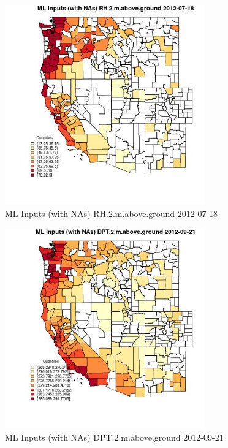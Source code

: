\begin{figure} 
\centering  
\includegraphics[width=0.77\textwidth]{Code_Outputs/Report_ML_input_PM25_Step4_part_e_de_duplicated_aves_compiled_2019-05-14wNAs_CountyRH2mabovegroundMean2012-07-18_2012-07-18.jpg} 
\caption{\label{fig:Report_ML_input_PM25_Step4_part_e_de_duplicated_aves_compiled_2019-05-14wNAsCountyRH2mabovegroundMean2012-07-18_2012-07-18}ML Inputs (with NAs) RH.2.m.above.ground 2012-07-18} 
\end{figure} 
 

\begin{figure} 
\centering  
\includegraphics[width=0.77\textwidth]{Code_Outputs/Report_ML_input_PM25_Step4_part_e_de_duplicated_aves_compiled_2019-05-14wNAs_CountyDPT2mabovegroundMean2012-09-21_2012-09-21.jpg} 
\caption{\label{fig:Report_ML_input_PM25_Step4_part_e_de_duplicated_aves_compiled_2019-05-14wNAsCountyDPT2mabovegroundMean2012-09-21_2012-09-21}ML Inputs (with NAs) DPT.2.m.above.ground 2012-09-21} 
\end{figure} 
 

